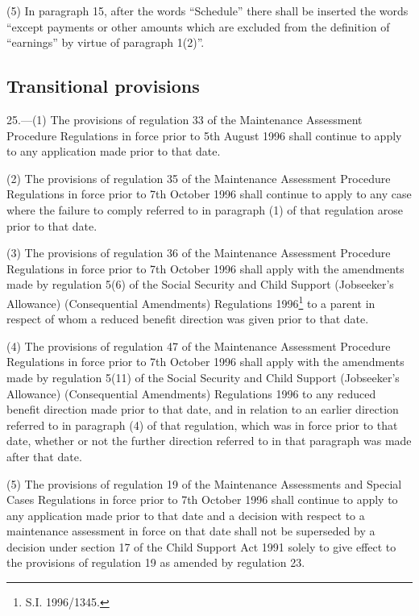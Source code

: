\documentclass[12pt,a4paper]{article}
\begin{document}
(5) In paragraph 15, after the words “Schedule” there shall be inserted the words “except payments or other amounts which are excluded from the definition of “earnings” by virtue of paragraph 1(2)”.

\subsection[25. Transitional provisions]{Transitional provisions}

25.—(1) The provisions of regulation 33 of the Maintenance Assessment Procedure Regulations in force prior to 5th August 1996 shall continue to apply to any application made prior to that date.

(2) The provisions of regulation 35 of the Maintenance Assessment Procedure Regulations in force prior to 7th October 1996 shall continue to apply to any case where the failure to comply referred to in paragraph (1) of that regulation arose prior to that date.

(3) The provisions of regulation 36 of the Maintenance Assessment Procedure Regulations in force prior to 7th October 1996 shall 
apply with the amendments made by regulation 5(6) of the Social Security and Child Support (Jobseeker’s Allowance) (Consequential Amendments) Regulations 1996\footnote{\frenchspacing S.I. 1996/1345.}  %
to a parent in respect of whom a reduced benefit direction was given prior to that date.

(4) The provisions of regulation 47 of the Maintenance Assessment Procedure Regulations in force prior to 7th October 1996 shall 
apply with the amendments made by regulation 5(11) of the Social Security and Child Support (Jobseeker’s Allowance) (Consequential Amendments) Regulations 1996  %
to any reduced benefit direction made prior to that date, and in relation to an earlier direction referred to in paragraph (4) of that regulation, which was in force prior to that date, whether or not the further direction referred to in that paragraph was made after that date.

(5) The provisions of regulation 19 of the Maintenance Assessments and Special Cases Regulations in force prior to 7th October 1996 shall continue to apply to any application made prior to that date 
and a decision with respect to a maintenance assessment in force on that date shall not be superseded by a decision under section 17 of the Child Support Act 1991 solely to give effect to the provisions of regulation 19 as amended by regulation 23.  %
\end{document}

